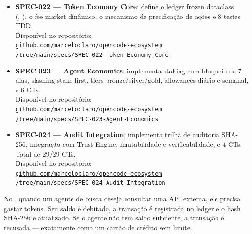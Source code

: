 \begin{itemize}
\item \textbf{SPEC-022 --- Token Economy Core}: define o
ledger frozen dataclass \\%
\hspace*{4em}(,
), o fee market dinâmico, o mecanismo de
precificação de ações e 8 testes TDD. \\Disponível no repositório: \\%
\hspace*{2em}\href{https://github.com/MarceloClaro/OpenCode_Ecosystem}{\texttt{github.com/marceloclaro/opencode-ecosystem}}\\%
\hspace*{4em}\texttt{/tree/main/specs/SPEC-022-Token-Economy-Core}
\item \textbf{SPEC-023 --- Agent Economics}: implementa staking
com bloqueio de 7 dias, slashing stake-first, tiers
bronze/silver/gold, allowances diário e semanal, e 6 CTs. \\Disponível no repositório: \\%
\hspace*{2em}\href{https://github.com/MarceloClaro/OpenCode_Ecosystem}{\texttt{github.com/marceloclaro/opencode-ecosystem}}\\%
\hspace*{4em}\texttt{/tree/main/specs/SPEC-023-Agent-Economics}
\item \textbf{SPEC-024 --- Audit Integration}: implementa trilha
de auditoria SHA-256, integração com Trust Engine, imutabilidade
e verificabilidade, e 4 CTs. Total de 29/29 CTs. \\Disponível no repositório: \\%
\hspace*{2em}\href{https://github.com/MarceloClaro/OpenCode_Ecosystem}{\texttt{github.com/marceloclaro/opencode-ecosystem}}\\%
\hspace*{4em}\texttt{/tree/main/specs/SPEC-024-Audit-Integration}
\end{itemize}

\begin{exemplo}
No \opencodeeco{}, quando um agente de busca deseja consultar uma
API externa, ele precisa gastar tokens. Seu saldo é debitado, a
transação é registrada no ledger e o hash SHA-256 é atualizado.
Se o agente não tem saldo suficiente, a transação é recusada —
exatamente como um cartão de crédito sem limite.
\end{exemplo}

